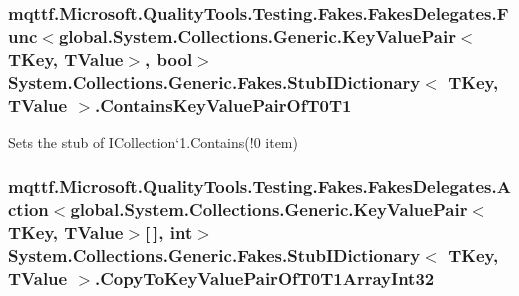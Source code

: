 \hypertarget{class_system_1_1_collections_1_1_generic_1_1_fakes_1_1_stub_i_dictionary_3_01_t_key_00_01_t_value_01_4_abfb262ea0260154a9ef91fd321b2b46a}{
\subsubsection[{Contains\-Key\-Value\-Pair\-Of\-T0\-T1}]{\setlength{\rightskip}{0pt plus 5cm}mqttf.\-Microsoft.\-Quality\-Tools.\-Testing.\-Fakes.\-Fakes\-Delegates.\-Func$<$global.\-System.\-Collections.\-Generic.\-Key\-Value\-Pair$<$T\-Key, T\-Value$>$, bool$>$ System.\-Collections.\-Generic.\-Fakes.\-Stub\-I\-Dictionary$<$ T\-Key, T\-Value $>$.Contains\-Key\-Value\-Pair\-Of\-T0\-T1}}\label{class_system_1_1_collections_1_1_generic_1_1_fakes_1_1_stub_i_dictionary_3_01_t_key_00_01_t_value_01_4_abfb262ea0260154a9ef91fd321b2b46a}


Sets the stub of I\-Collection`1.Contains(!0 item)

\hypertarget{class_system_1_1_collections_1_1_generic_1_1_fakes_1_1_stub_i_dictionary_3_01_t_key_00_01_t_value_01_4_aca5bb22399a133c03eb8426e329983c0}{
\subsubsection[{Copy\-To\-Key\-Value\-Pair\-Of\-T0\-T1\-Array\-Int32}]{\setlength{\rightskip}{0pt plus 5cm}mqttf.\-Microsoft.\-Quality\-Tools.\-Testing.\-Fakes.\-Fakes\-Delegates.\-Action$<$global.\-System.\-Collections.\-Generic.\-Key\-Value\-Pair$<$T\-Key, T\-Value$>$\mbox{[}$\,$\mbox{]}, int$>$ System.\-Collections.\-Generic.\-Fakes.\-Stub\-I\-Dictionary$<$ T\-Key, T\-Value $>$.Copy\-To\-Key\-Value\-Pair\-Of\-T0\-T1\-Array\-Int32}}\label{class_system_1_1_collections_1_1_generic_1_1_fakes_1_1_stub_i_dictionary_3_01_t_key_00_01_t_value_01_4_aca5bb22399a133c03eb8426e329983c0}



